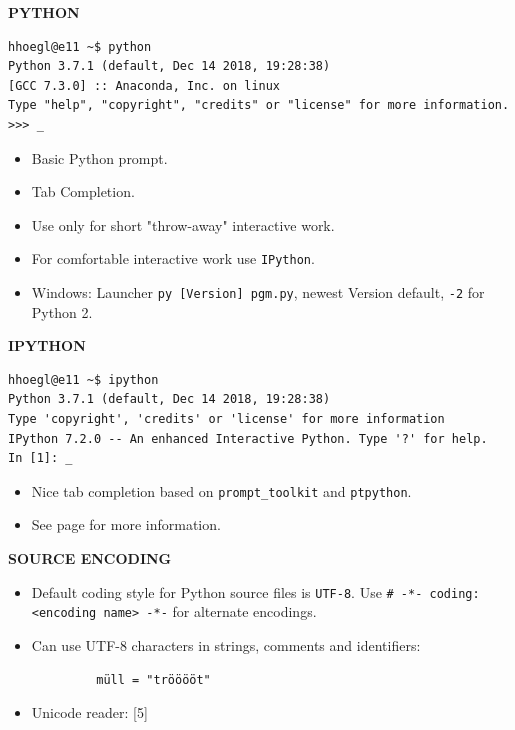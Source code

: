 \documentclass[9pt,a4wide]{extarticle}
\begin{document}
\bigskip
{\large\bf PYTHON}
{}

\begin{verbatim}
hhoegl@e11 ~$ python
Python 3.7.1 (default, Dec 14 2018, 19:28:38) 
[GCC 7.3.0] :: Anaconda, Inc. on linux
Type "help", "copyright", "credits" or "license" for more information.
>>> _ 
\end{verbatim}

\begin{itemize}
\item Basic Python prompt.
\item Tab Completion.
\item Use only for short "throw-away" interactive work.
\item For comfortable interactive work use {\tt IPython}.
\item Windows: Launcher {\tt py [Version] pgm.py}, newest Version default, 
      {\tt -2} for Python 2.
\end{itemize}


\bigskip
{\large\bf IPYTHON}
{}

\begin{verbatim}
hhoegl@e11 ~$ ipython
Python 3.7.1 (default, Dec 14 2018, 19:28:38) 
Type 'copyright', 'credits' or 'license' for more information
IPython 7.2.0 -- An enhanced Interactive Python. Type '?' for help.
In [1]: _
\end{verbatim}

\bigskip

\begin{itemize}

\item Nice tab completion based on {\tt prompt\_toolkit} and {\tt ptpython}.

\item See page \pageref{ipy-section} for more information.

\end{itemize}



\bigskip
{\large\bf SOURCE ENCODING}
{}

\begin{itemize}

\item Default coding style for Python source files is {\tt UTF-8}. Use
    {\tt \# -*- coding: <encoding name> -*-} for alternate encodings.

\item Can use UTF-8 characters in strings, comments and identifiers:

\begin{verbatim}
         müll = "trööööt"    
\end{verbatim}
 
\item Unicode reader: [5] 

\end{itemize}
\end{document}
